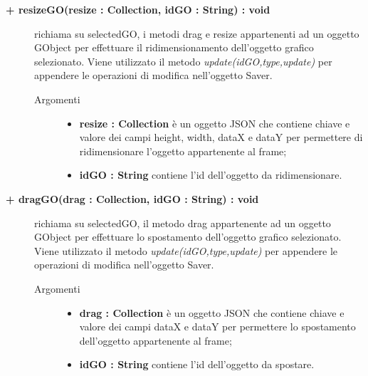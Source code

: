 \begin{description}
\begin{description}
\begin{description}
\begin{description}
\end{description}

\end{description}

\begin{description}
		\item[\textbf{\color{blue}+ resizeGO(resize : Collection, idGO : String) : void			}] \hfill
			richiama su selectedGO, i metodi drag e resize appartenenti ad un oggetto GObject per effettuare il ridimensionamento dell'oggetto grafico selezionato. Viene utilizzato il metodo \textit{update(idGO,type,update)} per appendere le operazioni di modifica nell'oggetto Saver.    

\begin{description}
			\item[Argomenti] \hfill
				\begin{itemize}
					\item \textbf{resize : Collection			} \hfill
					è un oggetto JSON che contiene chiave e valore dei campi height, width, dataX e dataY per permettere di ridimensionare l'oggetto appartenente al frame;
					\item \textbf{idGO : String			} \hfill
					contiene l'id dell'oggetto da ridimensionare.
				\end{itemize}

\end{description}

\end{description}

\begin{description}
		\item[\textbf{\color{blue}+ dragGO(drag : Collection, idGO : String) : void			}] \hfill
		richiama su selectedGO, il metodo drag appartenente ad un oggetto GObject per effettuare lo spostamento dell'oggetto grafico selezionato. Viene utilizzato il metodo \textit{update(idGO,type,update)} per appendere le operazioni di modifica nell'oggetto Saver.    

\begin{description}
			\item[Argomenti] \hfill
				\begin{itemize}
					\item \textbf{drag : Collection			} \hfill
					è un oggetto JSON che contiene chiave e valore dei campi dataX e dataY per permettere lo spostamento dell'oggetto appartenente al frame;
					\item \textbf{idGO : String			} \hfill
					contiene l'id dell'oggetto da spostare.
				\end{itemize}


\end{description}
\end{description}
\end{description}
\end{description}
